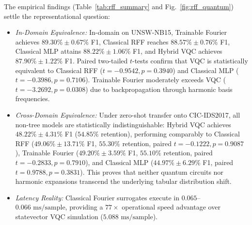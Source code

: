 \documentclass[conference]{IEEEtran}
\begin{document}
The empirical findings (Table~\ref{tab:rff_summary} and Fig.~\ref{fig:rff_quantum}) settle the representational question:
\begin{itemize}
    \item \textit{In-Domain Equivalence:} In-domain on UNSW-NB15, Trainable Fourier achieves $89.30\% \pm 0.67\%$ F1, Classical RFF reaches $88.57\% \pm 0.76\%$ F1, Classical MLP attains $88.22\% \pm 1.06\%$ F1, and Hybrid VQC achieves $87.90\% \pm 1.22\%$ F1. Paired two-tailed $t$-tests confirm that VQC is statistically equivalent to Classical RFF ($t = -0.9542, p = 0.3940$) and Classical MLP ($t = -0.3986, p = 0.7106$). Trainable Fourier moderately exceeds VQC ($t = -3.2692, p = 0.0308$) due to backpropagation through harmonic basis frequencies.
    \item \textit{Cross-Domain Equivalence:} Under zero-shot transfer onto CIC-IDS2017, all non-tree models are statistically indistinguishable: Hybrid VQC achieves $48.22\% \pm 4.31\%$ F1 ($54.85\%$ retention), performing comparably to Classical RFF ($49.06\% \pm 13.71\%$ F1, $55.30\%$ retention, paired $t = -0.1222, p = 0.9087$), Trainable Fourier ($49.20\% \pm 3.59\%$ F1, $55.10\%$ retention, paired $t = -0.2833, p = 0.7910$), and Classical MLP ($44.97\% \pm 6.29\%$ F1, paired $t = 0.9788, p = 0.3831$). This proves that neither quantum circuits nor harmonic expansions transcend the underlying tabular distribution shift.
    \item \textit{Latency Reality:} Classical Fourier surrogates execute in $0.065$--$0.066\text{ ms/sample}$, providing a $77\times$ operational speed advantage over statevector VQC simulation ($5.088\text{ ms/sample}$).
\end{itemize}

\begin{table}[t]
\centering
\caption{CLASSICAL FOURIER SURROGATES VS. HYBRID VQC (5 SEEDS)}
\label{tab:rff_summary}
\end{table}
\end{document}
